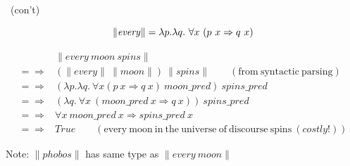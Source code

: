 \documentclass[logoontitle,tabu,supertabular,aspectratio=43]{preney-uwindsor-beamer}
\newcommand{\phobos}{\mathit{phobos}}
\newcommand{\every}{\mathit{every}}
\newcommand{\spins}{\mathit{spins}}
\newcommand{\moon}{\mathit{moon}}
\newcommand{\meaningof}[1]{\lVert #1 \rVert}
\newcommand{\wordpred}[1]{\mathit{#1\_pred}}
\newcommand{\True}{\mathit{True}}
\begin{document}
    \begin{frame}{\insertsubsection\ (con't)}

        \begin{equation*}
            \meaningof{\every} = \lambda p.\lambda q. \  \forall x \  (p \  x \Rightarrow q \  x) \\
        \end{equation*}

        \begin{equation*}
            \begin{split}
                & \meaningof{\every \  \moon \  \spins} \\
                =\!\Rightarrow&  (\meaningof{\every} \  \meaningof{\moon}) \  \meaningof{\spins} \qquad(\mathrm{from}\ \mathrm{syntactic}\ \mathrm{parsing}) \\
                =\!\Rightarrow&  (\lambda p.\lambda q.\ \forall x (p \  x \Rightarrow q \  x) \  \wordpred{\moon}) \  \wordpred{\spins} \\
                =\!\Rightarrow&  (\lambda q.\ \forall x \  (\wordpred{\moon} \   x \Rightarrow q \   x)) \  \wordpred{spins} \\
                =\!\Rightarrow&  \forall x \  \wordpred{\moon} \   x \Rightarrow \wordpred{spins} \   x \\
                =\!\Rightarrow&  \True \qquad(\mathrm{every}\ \mathrm{moon}\ \mathrm{in}\ \mathrm{the}\ \mathrm{universe \ of\ discourse}\ \mathrm{spins}\ (\mathit{costly!}))
            \end{split}
        \end{equation*}
        \centering

        Note: $\meaningof{\phobos}$ has same type as $\meaningof{\every\ \moon}$

    \end{frame}
\end{document}
